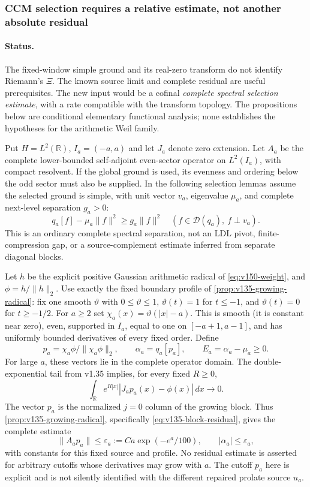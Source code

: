 \documentclass[11pt]{article}
\theoremstyle{remark}
\begin{document}

\subsubsection*{CCM selection requires a relative estimate, not another absolute residual}

\paragraph{Status.}
The fixed-window simple ground and its real-zero transform do not identify
Riemann's $\Xi$. The known source limit and complete residual are useful
prerequisites. The new input would be a cofinal \emph{complete spectral
selection estimate}, with a rate compatible with the transform topology.
The propositions below are conditional elementary functional analysis;
none establishes the hypotheses for the arithmetic Weil family.

Put $H=L^2(\mathbb R)$, $I_a=(-a,a)$ and let $J_a$ denote zero extension.
Let $A_a$ be the complete lower-bounded self-adjoint even-sector operator
on $L^2(I_a)$, with compact resolvent. If the global ground is used,
its evenness and ordering below the odd sector must also be supplied.
In the following selection lemmas assume the selected ground is simple,
with unit vector $v_a$, eigenvalue $\mu_a$, and complete next-level
separation $g_a>0$:
\[
 q_a[f]-\mu_a\|f\|^2\ge g_a\|f\|^2
 \quad(f\in\mathcal D(q_a),\ f\perp v_a).
\]
This is an ordinary complete spectral separation, not an LDL pivot,
finite-compression gap, or a source-complement estimate inferred from
separate diagonal blocks.

Let $h$ be the explicit positive Gaussian arithmetic radical of
\eqref{eq:v150-weight}, and $\phi=h/\|h\|_2$. Use exactly the fixed
boundary profile of \ref{prop:v135-growing-radical}: fix one smooth
$\vartheta$ with $0\le\vartheta\le1$, $\vartheta(t)=1$ for $t\le-1$,
and $\vartheta(t)=0$ for $t\ge-1/2$. For $a\ge2$ set
$\chi_a(x)=\vartheta(|x|-a)$. This is smooth (it is constant near zero),
even, supported in $I_a$, equal to one on $[-a+1,a-1]$, and has
uniformly bounded derivatives of every fixed order. Define
\[
 p_a=\chi_a\phi/\|\chi_a\phi\|_2,\qquad
 \alpha_a=q_a[p_a],\qquad E_a=\alpha_a-\mu_a\ge0.
\]
For large $a$, these vectors lie in the complete operator domain.
The double-exponential tail from v1.35 implies, for every fixed $R\ge0$,
\[
 \int_{\mathbb R}e^{R|x|}|J_ap_a(x)-\phi(x)|\,dx\longrightarrow0.
\]
The vector $p_a$ is the normalized $j=0$ column of the growing block.
Thus \ref{prop:v135-growing-radical}, specifically
\eqref{eq:v135-block-residual}, gives the complete estimate
\[
 \|A_ap_a\|\le\varepsilon_a:=Ca\exp(-e^a/100),\qquad
 |\alpha_a|\le\varepsilon_a,
\]
with constants for this fixed source and profile. No residual estimate
is asserted for arbitrary cutoffs whose derivatives may grow with $a$.
The cutoff $p_a$ here is explicit and is not silently identified with
the different repaired prolate source $u_a$.
\end{document}
